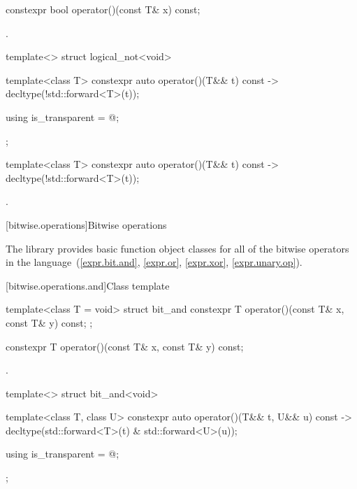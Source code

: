 %
\begin{itemdecl}
constexpr bool operator()(const T& x) const;
\end{itemdecl}

\begin{itemdescr}
\pnum
\returns
{}.
\end{itemdescr}

%
\begin{itemdecl}
template<> struct logical_not<void> {
  template<class T> constexpr auto operator()(T&& t) const
    -> decltype(!std::forward<T>(t));

  using is_transparent = @\unspec@;
};
\end{itemdecl}

%
\begin{itemdecl}
template<class T> constexpr auto operator()(T&& t) const
    -> decltype(!std::forward<T>(t));
\end{itemdecl}

\begin{itemdescr}
\pnum
\returns
{}.
\end{itemdescr}


[bitwise.operations]{Bitwise operations}

\pnum
The library provides basic function object classes for all of the bitwise
operators in the language~(\ref{expr.bit.and}, \ref{expr.or},
\ref{expr.xor}, \ref{expr.unary.op}).

[bitwise.operations.and]{Class template }

%
\begin{itemdecl}
template<class T = void> struct bit_and {
  constexpr T operator()(const T& x, const T& y) const;
};
\end{itemdecl}

%
\begin{itemdecl}
constexpr T operator()(const T& x, const T& y) const;
\end{itemdecl}

\begin{itemdescr}
\pnum
\returns
{}.
\end{itemdescr}

%
\begin{itemdecl}
template<> struct bit_and<void> {
  template<class T, class U> constexpr auto operator()(T&& t, U&& u) const
    -> decltype(std::forward<T>(t) & std::forward<U>(u));

  using is_transparent = @\unspec@;
};
\end{itemdecl}

